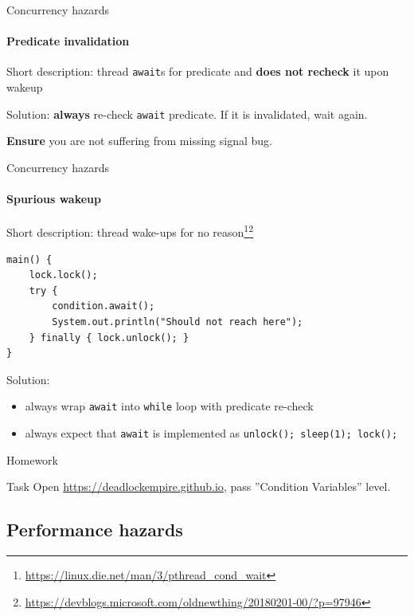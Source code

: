 \begin{frame}{Concurrency hazards}
\framesubtitle{Predicate invalidation}

Short description: thread \texttt{await}s for predicate and \textbf{does not recheck} it upon wakeup

Solution: \textbf{always} re-check \texttt{await} predicate. If it is invalidated, wait again. 

\textbf{Ensure} you are not suffering from missing signal bug.
\end{frame}


\begin{frame}[fragile]{Concurrency hazards}
\framesubtitle{Spurious wakeup}

Short description: thread wake-ups for no reason\footnote{\url{https://linux.die.net/man/3/pthread_cond_wait}}\footnote{\url{https://devblogs.microsoft.com/oldnewthing/20180201-00/?p=97946}}

\begin{verbatim}
main() {
    lock.lock();
    try {
        condition.await();
        System.out.println("Should not reach here");
    } finally { lock.unlock(); }    
}
\end{verbatim}

\pause

Solution:
\begin{itemize} 
    \item always wrap \texttt{await} into \texttt{while} loop with predicate re-check
    \item always expect that \texttt{await} is implemented as \texttt{unlock(); sleep(1); lock();}
\end{itemize}
\end{frame}


\begin{frame}{Homework}

\begin{homeworkmail}{Task \taskEmpireCond}{
    Open \url{https://deadlockempire.github.io}, pass ''Condition Variables'' level.
}
\end{homeworkmail}

\end{frame}


\subsection{Performance hazards}

